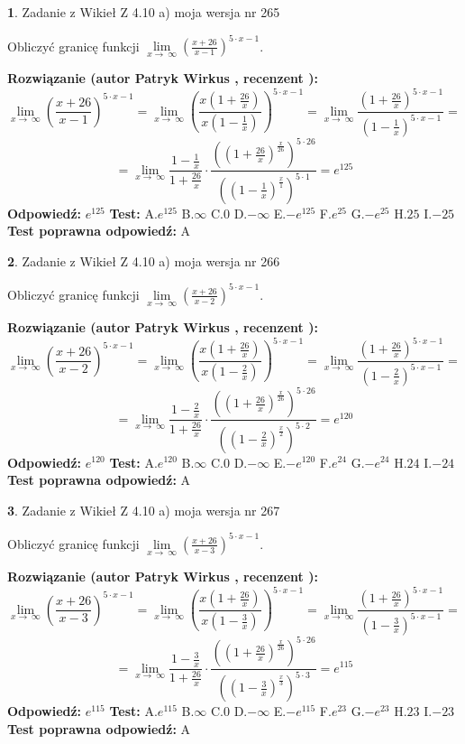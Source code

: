 \documentclass[12pt, a4paper]{article}
\theoremstyle{definition} %
\newtheorem{zad}{}
\newcommand{\zadStart}[1]{\begin{zad}#1\newline}
\newcommand{\zadStop}{\end{zad}}
\newcommand{\rozwStart}[2]{\noindent \textbf{Rozwiązanie (autor #1 , recenzent #2): }\newline}
\newcommand{\rozwStop}{\newline}
\newcommand{\odpStart}{\noindent \textbf{Odpowiedź:}\newline}
\newcommand{\odpStop}{\newline}
\newcommand{\testStart}{\noindent \textbf{Test:}\newline}
\newcommand{\testStop}{\newline}
\newcommand{\kluczStart}{\noindent \textbf{Test poprawna odpowiedź:}\newline}
\newcommand{\kluczStop}{\newline}
\begin{document}
\zadStart{Zadanie z Wikieł Z 4.10 a) moja wersja nr 265}

Obliczyć granicę funkcji  $\lim\limits_{x\to\ \infty}(\frac{x+26}{x-1})^{5\cdot x-1}$.
\zadStop
\rozwStart{Patryk Wirkus}{}
$$\lim\limits_{x\to\ \infty}(\frac{x+26}{x-1})^{5\cdot x-1} = \lim\limits_{x\to\ \infty}(\frac{x(1+\frac{26}{x})}{x(1-\frac{1}{x})})^{5\cdot x-1}=\lim\limits_{x\to\ \infty}\frac{(1+\frac{26}{x})^{5\cdot x-1}}{(1-\frac{1}{x})^{5\cdot x-1}}=$$
$$=\lim\limits_{x\to\ \infty}\frac{1-\frac{1}{x}}{1+\frac{26}{x}}\cdot\frac{((1+\frac{26}{x})^{\frac{x}{26}})^{5\cdot26}}{((1-\frac{1}{x})^{\frac{x}{1}})^{5\cdot1}}=e^{125}$$
\rozwStop
\odpStart
$e^{125}$
\odpStop
\testStart
A.$e^{125}$ B.$\infty$ C.$0$ D.$-\infty$ E.$-e^{125}$
F.$e^{25}$ G.$-e^{25}$
H.$25$
I.$-25$
\testStop
\kluczStart
A
\kluczStop



\zadStart{Zadanie z Wikieł Z 4.10 a) moja wersja nr 266}

Obliczyć granicę funkcji  $\lim\limits_{x\to\ \infty}(\frac{x+26}{x-2})^{5\cdot x-1}$.
\zadStop
\rozwStart{Patryk Wirkus}{}
$$\lim\limits_{x\to\ \infty}(\frac{x+26}{x-2})^{5\cdot x-1} = \lim\limits_{x\to\ \infty}(\frac{x(1+\frac{26}{x})}{x(1-\frac{2}{x})})^{5\cdot x-1}=\lim\limits_{x\to\ \infty}\frac{(1+\frac{26}{x})^{5\cdot x-1}}{(1-\frac{2}{x})^{5\cdot x-1}}=$$
$$=\lim\limits_{x\to\ \infty}\frac{1-\frac{2}{x}}{1+\frac{26}{x}}\cdot\frac{((1+\frac{26}{x})^{\frac{x}{26}})^{5\cdot26}}{((1-\frac{2}{x})^{\frac{x}{2}})^{5\cdot2}}=e^{120}$$
\rozwStop
\odpStart
$e^{120}$
\odpStop
\testStart
A.$e^{120}$ B.$\infty$ C.$0$ D.$-\infty$ E.$-e^{120}$
F.$e^{24}$ G.$-e^{24}$
H.$24$
I.$-24$
\testStop
\kluczStart
A
\kluczStop



\zadStart{Zadanie z Wikieł Z 4.10 a) moja wersja nr 267}

Obliczyć granicę funkcji  $\lim\limits_{x\to\ \infty}(\frac{x+26}{x-3})^{5\cdot x-1}$.
\zadStop
\rozwStart{Patryk Wirkus}{}
$$\lim\limits_{x\to\ \infty}(\frac{x+26}{x-3})^{5\cdot x-1} = \lim\limits_{x\to\ \infty}(\frac{x(1+\frac{26}{x})}{x(1-\frac{3}{x})})^{5\cdot x-1}=\lim\limits_{x\to\ \infty}\frac{(1+\frac{26}{x})^{5\cdot x-1}}{(1-\frac{3}{x})^{5\cdot x-1}}=$$
$$=\lim\limits_{x\to\ \infty}\frac{1-\frac{3}{x}}{1+\frac{26}{x}}\cdot\frac{((1+\frac{26}{x})^{\frac{x}{26}})^{5\cdot26}}{((1-\frac{3}{x})^{\frac{x}{3}})^{5\cdot3}}=e^{115}$$
\rozwStop
\odpStart
$e^{115}$
\odpStop
\testStart
A.$e^{115}$ B.$\infty$ C.$0$ D.$-\infty$ E.$-e^{115}$
F.$e^{23}$ G.$-e^{23}$
H.$23$
I.$-23$
\testStop
\kluczStart
A
\kluczStop
\end{document}
